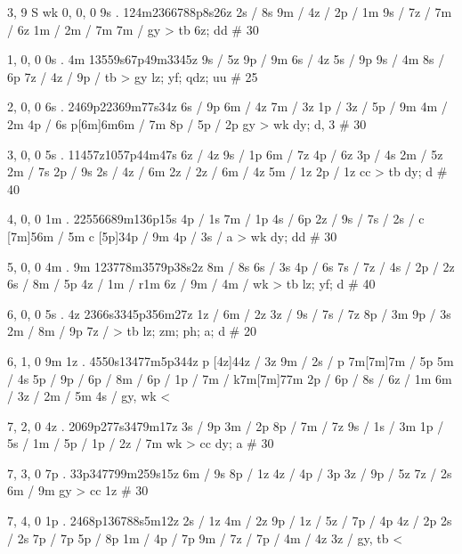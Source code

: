 3, 9
S
wk
0, 0, 0
9s . 
124m2366788p8s26z
2s / 8s
9m /
4z / 
2p / 1m 
9s /
7z /
7m / 6z
1m / 
2m / 7m
7m / 
gy > tb 
6z; dd # 30 

1, 0, 0
0s . 4m 
13559s67p49m3345z
9s / 5z 
9p / 9m
6s / 4z  
5s / 9p
9s / 4m 
8s / 6p
7z /
4z /
9p / 
tb > gy 
lz; yf; qdz; uu # 25

2, 0, 0 
6s .
2469p22369m77s34z
6s / 9p
6m / 4z 
7m / 3z 
1p / 
3z / 
5p / 9m
4m / 2m 
4p / 6s
p[6m]6m6m / 7m 
8p / 
5p / 2p 
gy > wk
dy; d, 3 # 30 

3, 0, 0
5s .
11457z1057p44m47s
6z / 4z 
9s / 1p 
6m / 7z
4p / 6z %
3p / 4s %
2m / 5z 
2m / 7s 
2p / 9s
2s / 
4z / 6m 
2z / 
2z / 
6m / 4z 
5m / 1z 
2p / 1z
cc > tb 
dy; d # 40 

4, 0, 0 
1m . 
22556689m136p15s
4p / 1s 
7m / 1p 
4s / 6p 
2z / 
9s / 
7s / 
2s / 
c [7m]56m / 5m 
c [5p]34p / 9m
4p / 
3s / a 
> wk 
dy; dd # 30 

5, 0, 0 
4m . 9m 
123778m3579p38s2z
8m / 8s
6s / 3s 
4p / 6s 
7s / 
7z / 
4s / 
2p / 2z 
6s / 
8m / 5p 
4z / 
1m / r1m
6z / 
9m / 
4m / 
wk > tb 
lz; yf; d # 40 

6, 0, 0
5s . 4z 
2366s3345p356m27z
1z / 
6m / 2z 
3z / 
9s / 
7s / 7z 
8p / 3m 
9p / 3s 
2m / 
8m / 9p
7z / 
> tb 
lz; zm; ph; a; d # 20 

6, 1, 0 
9m 1z . 
4550s13477m5p344z
p [4z]44z / 3z 
9m / 
2s / 
p 7m[7m]7m / 5p 
5m / 4s 
5p / 
9p / 
6p / 
8m / 
6p / 
1p / 
7m / k7m[7m]77m
2p / 
6p / 
8s / 
6z / 1m 
6m / 
3z / 
2m / 5m 
4s / 
gy, wk < 

7, 2, 0
4z . 
2069p277s3479m17z
3s / 9p 
3m / 2p 
8p / 
7m / 7z 
9s /
1s / 3m 
1p / 
5s / 
1m / 
5p /
1p / 
2z / 7m 
wk > cc 
dy; a # 30 

7, 3, 0 
7p . 
33p347799m259s15z
6m / 9s 
8p / 1z 
4z / 
4p / 3p 
3z / 
9p / 5z 
7z / 2s 
6m / 9m
gy > cc 
1z # 30 

7, 4, 0 
1p . 
2468p136788s5m12z
2s / 1z 
4m / 2z 
9p / 
1z /
5z / 
7p / 4p
4z / 2p 
2s / 2s %
7p / 7p %
5p / 8p %
1m / 
4p / 7p %
9m / 
7z /
7p /
4m / 4z 
3z / 
gy, tb <